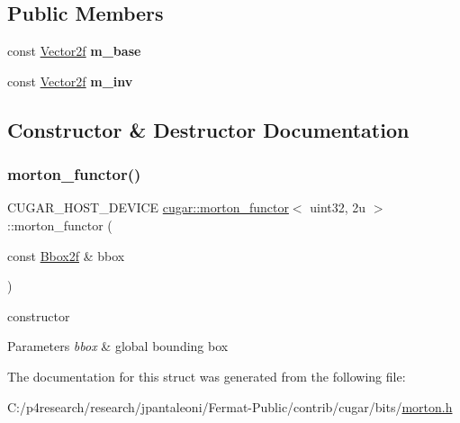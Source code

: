 \subsection*{Public Members}
\begin{DoxyCompactItemize}
\item 
\mbox{\label{structcugar_1_1morton__functor_3_01uint32_00_012u_01_4_a458c0b999251a147beda4b698c668027}} 
const \hyperlink{structcugar_1_1_vector}{Vector2f} {\bfseries m\+\_\+base}
\item 
\mbox{\label{structcugar_1_1morton__functor_3_01uint32_00_012u_01_4_a832c3bf12bee0a95b1ae0aa174ac3087}} 
const \hyperlink{structcugar_1_1_vector}{Vector2f} {\bfseries m\+\_\+inv}
\end{DoxyCompactItemize}


\subsection{Constructor \& Destructor Documentation}
\mbox{\label{structcugar_1_1morton__functor_3_01uint32_00_012u_01_4_a430c9e026c07cc94ad8c13dd6f8ce145}} 
\subsubsection{\texorpdfstring{morton\+\_\+functor()}{morton\_functor()}}
{\footnotesize\ttfamily C\+U\+G\+A\+R\+\_\+\+H\+O\+S\+T\+\_\+\+D\+E\+V\+I\+CE \hyperlink{structcugar_1_1morton__functor}{cugar\+::morton\+\_\+functor}$<$ uint32, 2u $>$\+::morton\+\_\+functor (\begin{DoxyParamCaption}\item[{const \hyperlink{structcugar_1_1_bbox}{Bbox2f} \&}]{bbox }\end{DoxyParamCaption})\hspace{0.3cm}{\ttfamily [inline]}}

constructor


\begin{DoxyParams}{Parameters}
{\em bbox} & global bounding box \\
\hline
\end{DoxyParams}


The documentation for this struct was generated from the following file\+:\begin{DoxyCompactItemize}
\item 
C\+:/p4research/research/jpantaleoni/\+Fermat-\/\+Public/contrib/cugar/bits/\hyperlink{morton_8h}{morton.\+h}\end{DoxyCompactItemize}
